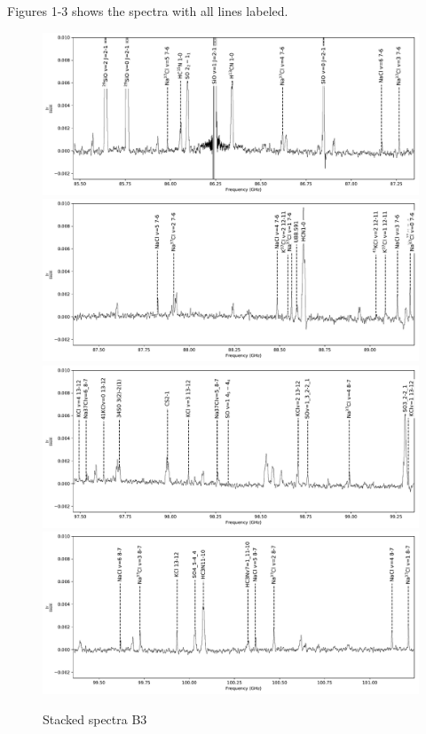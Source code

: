 \documentclass[twocolumn]{aastex62}
\begin{document}
Figures 1-3 shows the spectra with all lines labeled.

\begin{figure}[!htp]
\includegraphics[scale=1,width=5.5in]{figures/lines_labeled_OrionSourceI_B3_spw0_robust0.5.pdf}
\includegraphics[scale=1,width=5.5in]{figures/lines_labeled_OrionSourceI_B3_spw1_robust0.5.pdf}
\includegraphics[scale=1,width=5.5in]{figures/lines_labeled_OrionSourceI_B3_spw2_robust0.5.pdf}
\includegraphics[scale=1,width=5.5in]{figures/lines_labeled_OrionSourceI_B3_spw3_robust0.5.pdf}
\caption{Stacked spectra  B3}
\label{fig:spectrab3}
\end{figure}
\end{document}
